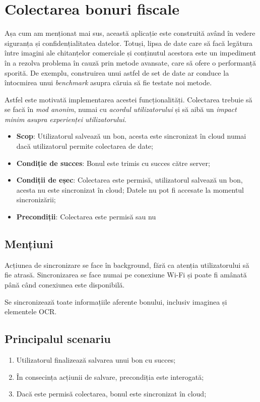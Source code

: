 \section{Colectarea bonuri fiscale}\label{spec:collecting}

Așa cum am menționat mai sus, această aplicație este construită având în vedere siguranța și confidențialitatea datelor. Totuși, lipsa de date care să facă legătura între imagini ale chitanțelor comerciale și conținutul acestora este un impediment în a rezolva problema în cauză prin metode avansate, care să ofere o performanță sporită. De exemplu, construirea unui astfel de set de date ar conduce la întocmirea unui \emph{benchmark} asupra căruia să fie testate noi metode. 

Astfel este motivată implementarea acestei funcționalități. Colectarea trebuie să se facă în \emph{mod anonim}, numai cu \emph{acordul utilizatorului} și să aibă un \emph{impact minim asupra experienței utilizatorului}.

\begin{itemize}
\item
  \textbf{Scop}: Utilizatorul salvează un bon, acesta este sincronizat în cloud numai dacă utilizatorul permite colectarea de date;
\item
  \textbf{Condiție de succes}: Bonul este trimis cu succes către server;
\item
  \textbf{Condiții de eșec}: Colectarea este permisă, utilizatorul salvează un bon, acesta nu este sincronizat în cloud; Datele nu pot fi accesate la momentul sincronizării;
\item
  \textbf{Precondiții}: Colectarea este permisă sau nu
\end{itemize}

\subsection*{Mențiuni}\label{menux21biuni-2}

Acțiunea de sincronizare se face în background, fără ca atenția utilizatorului să fie atrasă. Sincronizarea se face numai pe conexiune Wi-Fi și poate fi amânată până când conexiunea este disponibilă.

Se sincronizează toate informațiile aferente bonului, inclusiv imaginea și elementele OCR.

\subsection*{Principalul scenariu}\label{principalul-scenariu-3}

\begin{enumerate}
\item
  Utilizatorul finalizează salvarea unui bon cu succes;
\item
  În consecința acțiunii de salvare, precondiția este interogată;
\item
  Dacă este permisă colectarea, bonul este sincronizat în cloud;
\end{enumerate}